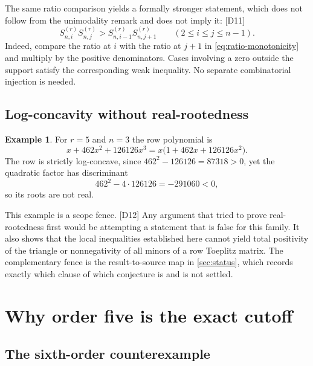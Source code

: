 \documentclass[11pt,a4paper]{article}
\numberwithin{equation}{section}
\theoremstyle{definition}
\newtheorem{example}[example]{Example}
\theoremstyle{remark}
\newcommand{\dup}[1]{{\small\textsf{\color{MutedInk}[#1]}}}
\begin{document}
The same ratio comparison yields a formally stronger statement, which does
not follow from the unimodality remark and does not imply it: \dup{D11}
\begin{equation}\label{eq:balanced}
 S^{(r)}_{n,i}S^{(r)}_{n,j}>S^{(r)}_{n,i-1}S^{(r)}_{n,j+1}
 \qquad(2\le i\le j\le n-1).
\end{equation}
Indeed, compare the ratio at $i$ with the ratio at $j+1$ in
\eqref{eq:ratio-monotonicity} and multiply by the positive denominators.
Cases involving a zero outside the support satisfy the corresponding weak
inequality. No separate combinatorial injection is needed.

\subsection{Log-concavity without real-rootedness}

\begin{example}\label{ex:nonreal}
For $r=5$ and $n=3$ the row polynomial is
\[
 x+462x^2+126126x^3=x\bigl(1+462x+126126x^2\bigr).
\]
The row is strictly log-concave, since $462^2-126126=87318>0$, yet the
quadratic factor has discriminant
\[
 462^2-4\cdot126126=-291060<0,
\]
so its roots are not real.
\end{example}

This example is a scope fence. \dup{D12} Any argument that tried to prove
real-rootedness first would be attempting a statement that is false for
this family. It also shows that the local inequalities established here
cannot yield total positivity of the triangle or nonnegativity of all
minors of a row Toeplitz matrix. The complementary fence is the
result-to-source map in \cref{sec:status}, which records exactly which
clause of which conjecture is and is not settled.

\section{Why order five is the exact cutoff}\label{sec:sharpness}

\subsection{The sixth-order counterexample}
\end{document}
